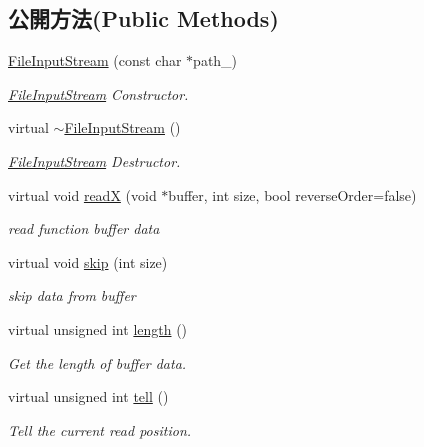 \subsection*{公開方法(Public Methods)}
\begin{DoxyCompactItemize}
\item 
\hyperlink{class_magnum_1_1_file_input_stream_afa33d318b4347b10712e69270a8d3d2e}{File\+Input\+Stream} (const char $\ast$path\+\_\+)
\begin{DoxyCompactList}\small\item\em \hyperlink{class_magnum_1_1_file_input_stream}{File\+Input\+Stream} Constructor. \end{DoxyCompactList}\item 
virtual \hyperlink{class_magnum_1_1_file_input_stream_a48dfa318f2d5ebefc1489ac44edefde5}{$\sim$\+File\+Input\+Stream} ()
\begin{DoxyCompactList}\small\item\em \hyperlink{class_magnum_1_1_file_input_stream}{File\+Input\+Stream} Destructor. \end{DoxyCompactList}\item 
virtual void \hyperlink{class_magnum_1_1_file_input_stream_a5ca686c3e5ec27ce9c5cec39bae10cdb}{readX} (void $\ast$buffer, int size, bool reverse\+Order=false)
\begin{DoxyCompactList}\small\item\em read function buffer data \end{DoxyCompactList}\item 
virtual void \hyperlink{class_magnum_1_1_file_input_stream_a20d195e941f8dd8d65d7cb3e49828dae}{skip} (int size)
\begin{DoxyCompactList}\small\item\em skip data from buffer \end{DoxyCompactList}\item 
virtual unsigned int \hyperlink{class_magnum_1_1_file_input_stream_ae99ba0a3810c71ff84a16db9c73dd3ec}{length} ()
\begin{DoxyCompactList}\small\item\em Get the length of buffer data. \end{DoxyCompactList}\item 
virtual unsigned int \hyperlink{class_magnum_1_1_file_input_stream_a0d2d5c30a1bbaa3a9f4209fae1c953d8}{tell} ()
\begin{DoxyCompactList}\small\item\em Tell the current read position. \end{DoxyCompactList}\item 

\end{DoxyCompactItemize}
